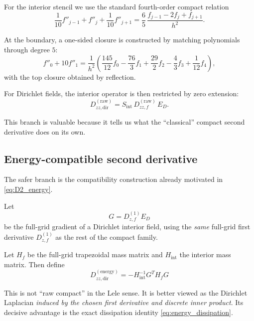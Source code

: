 \documentclass[11pt]{article}
\newcommand{\Hmat}{H}
\newcommand{\Emat}{E_D}
\newcommand{\Gmat}{G}
\begin{document}
For the interior stencil we use the standard fourth-order compact relation
\begin{equation}
\frac{1}{10} f''_{j-1} + f''_j + \frac{1}{10} f''_{j+1}
=
\frac{6}{5}\,\frac{f_{j-1} - 2f_j + f_{j+1}}{h^2}.
\label{eq:compact_second_interior}
\end{equation}

At the boundary, a one-sided closure is constructed by matching polynomials
through degree $5$:
\begin{equation}
f''_0 + 10 f''_1
=
\frac{1}{h^2}
\left(
\frac{145}{12} f_0
- \frac{76}{3} f_1
+ \frac{29}{2} f_2
- \frac{4}{3} f_3
+ \frac{1}{12} f_4
\right),
\label{eq:compact_second_boundary}
\end{equation}
with the top closure obtained by reflection.

For Dirichlet fields, the interior operator is then restricted by zero
extension:
\begin{equation}
\boxed{
D^{(\mathrm{raw})}_{zz,\mathrm{dir}}
=
S_{\mathrm{int}}\,D^{(\mathrm{raw})}_{zz,f}\,\Emat.
}
\label{eq:D2_raw_dir}
\end{equation}

This branch is valuable because it tells us what the ``classical'' compact
second derivative does on its own.

\subsection{Energy-compatible second derivative}

The safer branch is the compatibility construction already motivated in
\eqref{eq:D2_energy}.

Let
\begin{equation}
\boxed{
\Gmat = D^{(1)}_{z,f} \Emat
}
\label{eq:G_def}
\end{equation}
be the full-grid gradient of a Dirichlet interior field, using the \emph{same}
full-grid first derivative $D^{(1)}_{z,f}$ as the rest of the compact family.

Let $\Hmat_f$ be the full-grid trapezoidal mass matrix and
$\Hmat_{\mathrm{int}}$ the interior mass matrix. Then define
\begin{equation}
\boxed{
D^{(\mathrm{energy})}_{zz,\mathrm{dir}}
=
- \Hmat_{\mathrm{int}}^{-1}\Gmat^T \Hmat_f \Gmat
}
\label{eq:D2_compatible}
\end{equation}

This is not ``raw compact'' in the Lele sense. It is better viewed as the
Dirichlet Laplacian \emph{induced by the chosen first derivative and discrete
inner product}. Its decisive advantage is the exact dissipation identity
\eqref{eq:energy_dissipation}.
\end{document}
